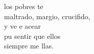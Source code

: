 \begin{cancion}%
	 los pobres  te \\
	maltrado, margio, crucifido,\\
	y ve e acear\\
	pu sentir que ellos\\
	siempre  me llas. \\
\end{cancion}%
